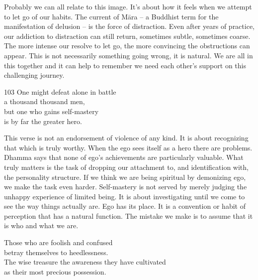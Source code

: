 \begin{dhpRefl}
Probably we can all relate to this image. It's about how it feels when we attempt to let go of our habits. The current of Māra – a Buddhist term for the manifestation of delusion –  is the force of distraction. Even after years of practice, our addiction to distraction can still return, sometimes subtle, sometimes coarse. The more intense our resolve to let go, the more convincing the obstructions can appear. This is not necessarily something going wrong, it is natural. We are all in this together and it can help to remember we need each other's support on this challenging journey.
\end{dhpRefl}


\begin{dhpVerse}{103}
\label{dhp-103}
One might defeat alone in battle\\
a thousand thousand men,\\
but one who gains self-mastery\\
is by far the greater hero.
\end{dhpVerse}

\begin{dhpRefl}
This verse is not an endorsement of violence of any kind. It is about recognizing that which is truly worthy. When the ego sees itself as a hero there are problems. Dhamma says that none of ego's achievements are particularly valuable. What truly matters is the task of dropping our attachment to, and identification with, the personality structure. If we think we are being spiritual by demonizing ego, we make the task even harder. Self-mastery is not served by merely judging the unhappy experience of limited being. It is about investigating until we come to see the way things actually are. Ego has its place. It is a convention or habit of perception that has a natural function. The mistake we make is to assume that it is who and what we are.
\end{dhpRefl}


\begin{dhpVerse}{26}
\label{dhp-26}
Those who are foolish and confused\\
betray themselves to heedlessness.\\
The wise treasure the awareness they have cultivated\\
as their most precious possession.
\end{dhpVerse}


